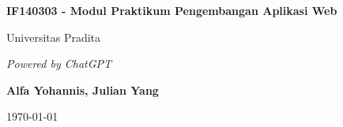 \documentclass{book}
\begin{document}
		
	\begin{titlepage}
		\centering
		\vspace*{1cm}
		
		\Huge
		\textbf{IF140303 - Modul Praktikum Pengembangan Aplikasi Web}
		
		\vspace{0.5cm}
		
		\LARGE
		Universitas Pradita
		
		\vspace{1.5cm}
		
		\textit{Powered by ChatGPT}
		
		\vspace{2cm}
		
		\textbf{Alfa Yohannis, Julian Yang}
		
		\vspace{0.8cm}
		
		\today
		
		\vfill
	\end{titlepage}
	
	\tableofcontents
	
	
	
		
\end{document}
